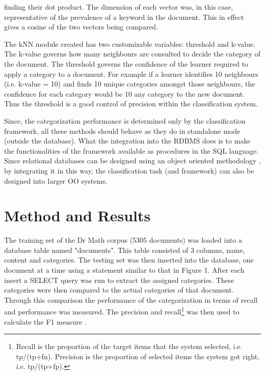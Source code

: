 \documentclass[twocolumn]{article}
\begin{document}
finding their dot product. The dimension of each vector was, in this case, 
representative of the prevalence of a keyword in the document. This in effect gives a 
cosine of the two vectors being compared. 

The kNN module created has two customizable variables: threshold and k-value. The 
k-value governs how many neighbours are consulted to decide the category of the 
document. The threshold governs the confidence of the learner required to apply a 
category to a document. For example if a learner identifies 10 neighbours (i.e. k-value 
= 10) and finds 10 unique categories amongst those neighbours, the confidence for 
each category would be 10%
any category to the new document. Thus the threshold is a good control of precision 
within the classification system.

Since, the categorization performance is determined only by the classification 
framework, all these methods should behave as they do in standalone mode (outside 
the database). What the integration into the RDBMS does is to make the 
functionalities of the framework available as procedures in the SQL language.
Since relational databases can be designed using an object oriented methodology \cite{blaha:88,
rumbaugh:91}, by integrating it in this way, the classification task 
(and framework) can also be designed into larger OO systems.

\section{Method and Results}

The training set of the Dr Math corpus (5305 documents) was loaded into a database 
table named "documents". This table consisted of 3 columns, name, content and 
categories. The testing set was then inserted into the database, one document at a time 
using a statement similar to that in Figure 1. After each insert a SELECT query was 
run to extract the assigned categories. These categories were then compared to the 
actual categories of that document. Through this comparison the performance of the 
categorization in terms of recall  and performance  was measured. The precision and 
recall\footnote{Recall is the proportion of the target items that the
system selected, i.e. tp/(tp+fn).  Precision is the proportion of
selected items the system got right, i.e. tp/(tp+fp).} was then used
to calculate the F1 measure \cite{calvo:01,sebastiani:02}.
\end{document}
